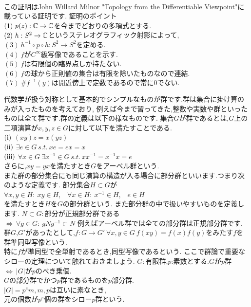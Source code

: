 \proof[多様体論を用いた代数学の基本定理の証明]
\leavevmode\\
この証明はJohn Willard Milnor "Topology from the Differentiable Viewpoint"に載っている証明です.
証明のポイント\\
$(1)\ p(z):\C\to\C$を今までどおりの多項式とする.\\
$(2)\ h:S^2\to\C$というステレオグラフィック射影によって,\\
$(3)\ h^{-1}\circ p \circ h : S^2 \to S^2$を定める.\\
$(4)\ f$が$C^\infty$級写像であることを示す.\\
$(5)\ f$は有限個の臨界点しか持たない.\\
$(6)\ f$の球から正則値の集合は有限を除いたものなので連結.\\
$(7)\ \# f^{-1}(y)$は開近傍上で定数であるので常に0でない.\\
\proofx

代数学が扱う対称として基本的でシンプルなものが群です.群は集合に掛け算のみが入ったものを考えており,
例えば今まで習ってきた,整数や実数や群といったものは全て群です.群の定義は以下の様なものです.
集合$G$が群であるとは,$G$上の二項演算が$x,y,z\in G$に対して以下を満たすことである.\\
$\rm (i)$ $(xy)z=x(yz)$\\
$\rm (ii)$ $\exists e \in  G \ s.t. \ xe=ex=x$\\
$\rm (iii)$ $\forall x\in G \ \exists x^{-1} \in G \ s.t. \ x x^{-1} = x^{-1} x= e$\\
さらに,$xy=yx$を満たすとき$G$をアーベル群という.\\
また群の部分集合にも同じ演算の構造が入る場合に部分群といいます.つまり次のような定義です.
部分集合$H\subset G$が\\
$\forall x,y \in H: \ xy\in H$,\ \ $\forall x\in H:\ x^{-1} \in H$,\ \ $e\in H$\\
を満たすとき$H$を$G$の部分群という.
また部分群の中で扱いやすいものを定義します.
$N\subset G:$部分が正規部分群である\\
$\iff \ \forall g\in G : \ gNg^{-1} \subset N$
例えばアーベル群では全ての部分群は正規部分群です.
群$G$,$G'$があったとして,$f:G\to G' \  \forall x,y \in G \ f(xy)=f(x)f(y)$をみたす$f$を群準同型写像という.\\
特に$f$が準同型で全単射であるとき,同型写像であるという.
ここで群論で重要なシローの定理について触れておきましょう.
$G:$有限群,$p$:素数とする.$G$が$p$群$\iff\ |G|$が$p$のべき乗個.\\
$G$の部分群でかつ$p$群であるものを$p$部分群.\\
$|G|=p^e m, m,p$は互いに素なとき,\\
元の個数が$p^e$個の群をシロー$p$群という.

